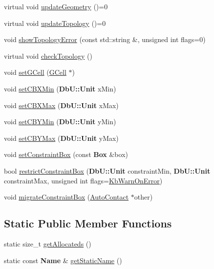 \begin{DoxyCompactItemize}
\item 
virtual void \hyperlink{classKatabatic_1_1AutoContact_af6a2454547eeb7f5a519970dcb467e90}{update\-Geometry} ()=0
\item 
virtual void \hyperlink{classKatabatic_1_1AutoContact_a690764ddc997fe9766a79c4b8e0c3e2f}{update\-Topology} ()=0
\item 
void \hyperlink{classKatabatic_1_1AutoContact_a66f92d8233776fb858075f78af451997}{show\-Topology\-Error} (const std\-::string \&, unsigned int flags=0)
\item 
virtual void \hyperlink{classKatabatic_1_1AutoContact_ac371cd5b837a8965c11297c197e70a45}{check\-Topology} ()
\item 
void \hyperlink{classKatabatic_1_1AutoContact_aa1a02e206437f1371a74cafc724b00d7}{set\-G\-Cell} (\hyperlink{classKatabatic_1_1GCell}{G\-Cell} $\ast$)
\item 
void \hyperlink{classKatabatic_1_1AutoContact_a9fcb986110e79bc0044f7bfe503acc0c}{set\-C\-B\-X\-Min} ({\bf Db\-U\-::\-Unit} x\-Min)
\item 
void \hyperlink{classKatabatic_1_1AutoContact_aaa7652f5db46cab9edb066d06ea979f9}{set\-C\-B\-X\-Max} ({\bf Db\-U\-::\-Unit} x\-Max)
\item 
void \hyperlink{classKatabatic_1_1AutoContact_a5b598929b39ad3ec202405b31ac02b1d}{set\-C\-B\-Y\-Min} ({\bf Db\-U\-::\-Unit} y\-Min)
\item 
void \hyperlink{classKatabatic_1_1AutoContact_a1fdb3737d910a966e150a86d885f3c05}{set\-C\-B\-Y\-Max} ({\bf Db\-U\-::\-Unit} y\-Max)
\item 
void \hyperlink{classKatabatic_1_1AutoContact_a5e5f791613d0ef8f4cf9e7d8f35dc4c5}{set\-Constraint\-Box} (const {\bf Box} \&box)
\item 
bool \hyperlink{classKatabatic_1_1AutoContact_ac893802d1c5518cab86f8341af817abe}{restrict\-Constraint\-Box} ({\bf Db\-U\-::\-Unit} constraint\-Min, {\bf Db\-U\-::\-Unit} constraint\-Max, unsigned int flags=\hyperlink{namespaceKatabatic_a2af2ad6b6441614038caf59d04b3b217aa5153b2cc25ebccca8616ce20ecd727a}{Kb\-Warn\-On\-Error})
\item 
void \hyperlink{classKatabatic_1_1AutoContact_a7fc4029992d75a62ce718e5e622f8ce9}{migrate\-Constraint\-Box} (\hyperlink{classKatabatic_1_1AutoContact}{Auto\-Contact} $\ast$other)
\end{DoxyCompactItemize}
\subsection*{Static Public Member Functions}
\begin{DoxyCompactItemize}
\item 
static size\-\_\-t \hyperlink{classKatabatic_1_1AutoContact_a91c8bc1a6bdb1b15c3c084ebfd38af47}{get\-Allocateds} ()
\item 
static const {\bf Name} \& \hyperlink{classKatabatic_1_1AutoContact_a00e56270cfb31f56e52e31afbc33ba71}{get\-Static\-Name} ()
\end{DoxyCompactItemize}
